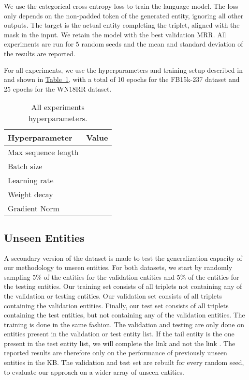 \documentclass[11pt,a4paper]{article}
\newcommand{\CiteT}[1]{\citet{#1}} \newcommand{\CiteP}[1]{~\citep{#1}} \newcommand{\CodeT}[1]{\texttt{#1}}
\newcommand{\RefTable}[1]{\hyperref[#1]{Table~\ref{#1}}}
\newcommand{\Table}[3]{\begin{table}[H]
\begin{center}
  \caption{#3}
  \vspace{-0.25\baselineskip}
  \label{#2}
  #1
\end{center}
\end{table}}
\begin{document}
We use the categorical cross-entropy loss to train the language model.
The loss only depends on the non-padded token of the generated entity, ignoring all other outputs.
The target is the actual entity completing the triplet, aligned with the mask in the input.
We retain the model with the best validation MRR.
All experiments are run for 5 random seeds and the mean and standard deviation of the results are reported.

For all experiments, we use the hyperparameters and training setup described in \CiteT{RoBERTa} and shown in \RefTable{tab:hparams}, with a total of 10 epochs for the FB15k-237 dataset and 25 epochs for the WN18RR dataset.

\Table{\begin{tabular}{m{}l}
    \toprule
    Hyperparameter & Value\\
    \midrule
    Max sequence length & \\
    Batch size & \\
    Learning rate & \\
    Weight decay & \\
    Gradient Norm & \\
    \bottomrule
  \end{tabular}}
{tab:hparams}
{All experiments hyperparameters.}



\subsection{Unseen Entities}

A secondary version of the dataset is made to test the generalization capacity of our methodology to unseen entities.
For both datasets, we start by randomly sampling 5\% of the entities for the validation entities and 5\% of the entities for the testing entities.
Our training set consists of all triplets not containing any of the validation or testing entities.
Our validation set consists of all triplets containing the validation entities.
Finally, our test set consists of all triplets containing the test entities, but not containing any of the validation entities.
The training is done in the same fashion.
The validation and testing are only done on entities present in the validation or test entity list.
If the tail entity is the one present in the test entity list, we will complete the link  and not the link .
The reported results are therefore only on the performance of previously unseen entities in the KB.
The validation and test set are rebuilt for every random seed, to evaluate our approach on a wider array of unseen entities.
\end{document}
